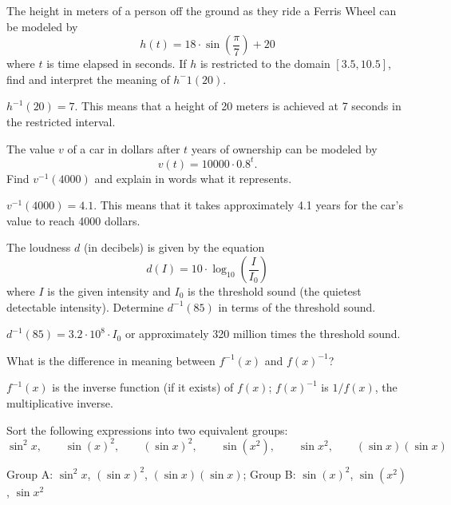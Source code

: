 \begin{exercises}
\begin{exercise}
The height in meters of a person off the ground as they ride a 
Ferris Wheel can be modeled by
\[
h(t) = 18\cdot \sin( \frac{\pi}{7} ) + 20
\]
where $t$ is time elapsed in seconds.  If $h$ is restricted to the
domain $[3.5, 10.5]$, find and interpret the meaning of $h^-1(20)$.
\begin{answer}
$h^{-1}(20)=7$.  This means that a height of 20 meters is achieved at 7 seconds
in the restricted interval.
\end{answer}
\end{exercise}


\begin{exercise}
The value $v$ of a car in dollars after $t$ years of ownership can be
modeled by
\[
v(t) = 10000\cdot 0.8^{t}.
\]
Find $v^{-1}(4000)$ and explain in words what it represents.
\begin{answer}
$v^{-1}(4000) = 4.1$.  This means that it takes approximately 4.1 years
for the car's value to reach 4000 dollars.
\end{answer}
\end{exercise}



\begin{exercise}
The loudness $d$ (in decibels) is given by the equation
\[
d(I) = 10\cdot \log_{10}\left(\frac{I}{I_0}\right)
\]
where $I$ is the given intensity and $I_0$ is the threshold sound (the
quietest detectable intensity).  Determine $d^{-1}(85)$ in terms of the
threshold sound.
\begin{answer}
$d^{-1}(85) = 3.2 \cdot 10^{8} \cdot  I_0$ or approximately 320 million times the threshold sound.
\end{answer}
\end{exercise}



\begin{exercise}
What is the difference in meaning between $f^{-1}(x)$ and $f(x)^{-1}$?
\begin{answer}
$f^{-1}(x)$ is the inverse function (if it exists) of $f(x)$;
  $f(x)^{-1}$ is $1/f(x)$, the multiplicative inverse.
\end{answer}
\end{exercise}



\begin{exercise}
Sort the following expressions into two equivalent groups:
\[
\sin^2 x, \qquad \sin(x)^2, \qquad (\sin x)^2, \qquad \sin(x^2), \qquad  \sin x^2, \qquad (\sin x)(\sin x)
\]
\begin{answer}
Group A:  $\sin^2x$, $(\sin x)^2$, $(\sin x)(\sin x)$;
Group B: $\sin(x)^2$, $\sin(x^2)$, $\sin x^2$
\end{answer}
\end{exercise}


\end{exercises}
